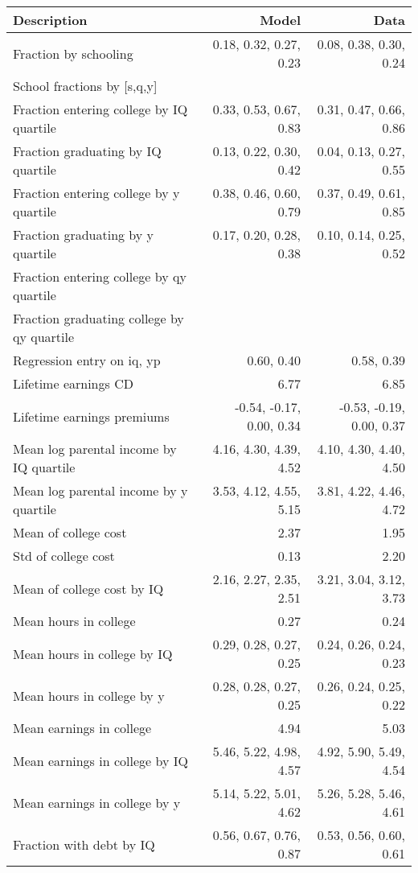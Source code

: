 \begin{tabular}{lrr}
\hline
Description & Model  & Data  \\ 
\hline
Fraction by schooling & 0.18, 0.32, 0.27, 0.23  & 0.08, 0.38, 0.30, 0.24  \\ 
School fractions by [s,q,y] &   &   \\ 
Fraction entering college by IQ quartile & 0.33, 0.53, 0.67, 0.83  & 0.31, 0.47, 0.66, 0.86  \\ 
Fraction graduating by IQ quartile & 0.13, 0.22, 0.30, 0.42  & 0.04, 0.13, 0.27, 0.55  \\ 
Fraction entering college by y quartile & 0.38, 0.46, 0.60, 0.79  & 0.37, 0.49, 0.61, 0.85  \\ 
Fraction graduating by y quartile & 0.17, 0.20, 0.28, 0.38  & 0.10, 0.14, 0.25, 0.52  \\ 
Fraction entering college by qy quartile &   &   \\ 
Fraction graduating college by qy quartile &   &   \\ 
Regression entry on iq, yp & 0.60, 0.40  & 0.58, 0.39  \\ 
Lifetime earnings CD & 6.77  & 6.85  \\ 
Lifetime earnings premiums & -0.54, -0.17, 0.00, 0.34  & -0.53, -0.19, 0.00, 0.37  \\ 
Mean log parental income by IQ quartile & 4.16, 4.30, 4.39, 4.52  & 4.10, 4.30, 4.40, 4.50  \\ 
Mean log parental income by y quartile & 3.53, 4.12, 4.55, 5.15  & 3.81, 4.22, 4.46, 4.72  \\ 
Mean of college cost & 2.37  & 1.95  \\ 
Std of college cost & 0.13  & 2.20  \\ 
Mean of college cost by IQ & 2.16, 2.27, 2.35, 2.51  & 3.21, 3.04, 3.12, 3.73  \\ 
Mean hours in college & 0.27  & 0.24  \\ 
Mean hours in college by IQ & 0.29, 0.28, 0.27, 0.25  & 0.24, 0.26, 0.24, 0.23  \\ 
Mean hours in college by y & 0.28, 0.28, 0.27, 0.25  & 0.26, 0.24, 0.25, 0.22  \\ 
Mean earnings in college & 4.94  & 5.03  \\ 
Mean earnings in college by IQ & 5.46, 5.22, 4.98, 4.57  & 4.92, 5.90, 5.49, 4.54  \\ 
Mean earnings in college by y & 5.14, 5.22, 5.01, 4.62  & 5.26, 5.28, 5.46, 4.61  \\ 
Fraction with debt by IQ & 0.56, 0.67, 0.76, 0.87  & 0.53, 0.56, 0.60, 0.61  \\ 

\end{tabular}
